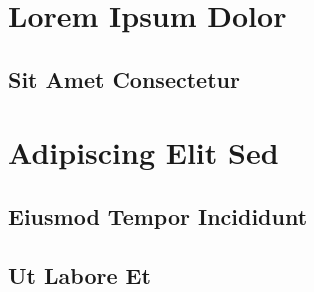 \documentclass[12pt]{article} %
\begin{document}
\section{Lorem Ipsum Dolor}
\lipsum[1][1-3]
\subsection{Sit Amet Consectetur}
\lipsum[2][1-3]
\section{Adipiscing Elit Sed}
\lipsum[3][1-3]
\subsection{Eiusmod Tempor Incididunt}
\lipsum[4][1-3]
\subsection{Ut Labore Et}
\lipsum[5][1-3]
\end{document}
